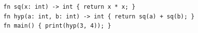 \begin{lstlisting}[language=nova,]
fn sq(x: int) -> int { return x * x; }
fn hyp(a: int, b: int) -> int { return sq(a) + sq(b); }
fn main() { print(hyp(3, 4)); }
\end{lstlisting}

